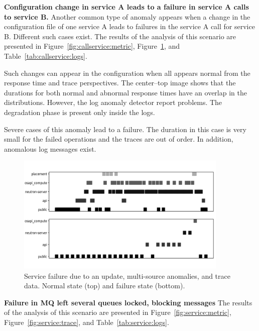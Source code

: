 \textbf{Configuration change in service A leads to a failure in service A calls to service B.}
Another common type of anomaly appears when a change in the configuration file of one service A leads to failures in the service A call for service B. Different such cases exist. The results of the analysis of this scenario are presented in Figure~\ref{fig:callservice:metric}, Figure~\ref{fig:callservice:traces}, and Table~\ref{tab:callservice:logs}.

Such changes can appear in the configuration when all appears normal from the response time and trace perspectives. The center--top image shows that the durations for both normal and abnormal response times have an overlap in the distributions.
However, the log anomaly detector report problems. The degradation phase is present only inside the logs. 

Severe cases of this anomaly lead to a failure. The duration in this case is very small for the failed operations and the traces are out of order. In addition, anomalous log messages exist.


\begin{figure}[!t]
\centerline{\includegraphics[width=0.9\textwidth]{gfx/chap7/serviceupdatetraces.pdf}}
\caption{Service failure due to an update, multi-source anomalies, and trace data. Normal state (top) and failure state (bottom).}
\label{fig:callservice:traces}
\end{figure}









\textbf{Failure in MQ left several queues locked, blocking messages}
The results of the analysis of this scenario are presented in Figure~\ref{fig:service:metric}, Figure~\ref{fig:service:trace}, and Table~\ref{tab:service:logs}.

